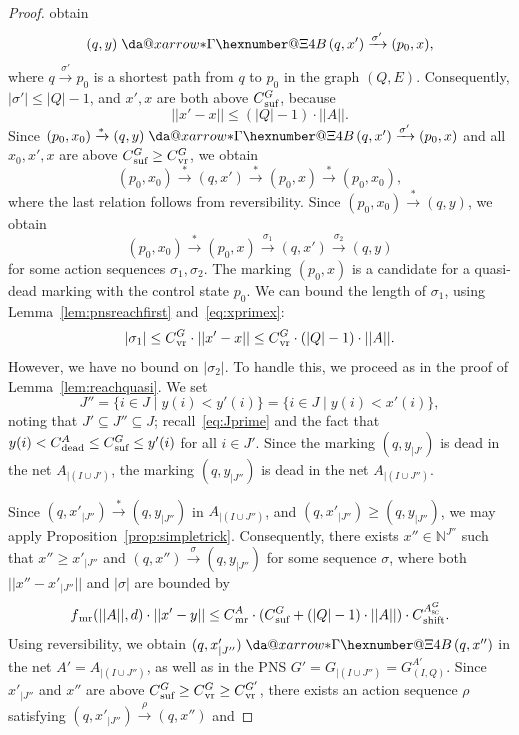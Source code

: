 \documentclass[11pt,a4paper]{amsart}
\makeatletter
\newcommand{\step}[1]{\mathrel{\xrightarrow{#1}}}
\newcommand{\reach}{\step{*}}
\newcommand{\virtual}[1]{\mathrel{\xdashrightarrow{#1}}\hspace{-0.3em}}
\newcommand{\vreach}{\virtual{*}}
\newcommand{\nnorm}[1]{||#1||}
\newcommand{\vr}{{}_\textnormal{vr}}
\newcommand{\mr}{{}_\textnormal{mr}}
\newcommand{\dead}{{}_\textnormal{dead}}
\newcommand{\suf}{{}_\textnormal{suf}}
\newcommand{\shift}{{}_\textnormal{shift}}
\newcommand{\ASC}{A_{\textsc{sc}}}
\newcommand{\Nat}{\mathbb{N}}
\newcommand{\restr}[1]{_{|{#1}}}
\newcommand{\setN}{\Nat}
\newcommand*{\da@rightarrow}{\mathchar"0\hexnumber@\symAMSa 4B }
\newcommand*{\xdashrightarrow}[2][]{%
  \mathrel{%
    \mathpalette{\da@xarrow{#1}{#2}{}\da@rightarrow{\,}{}}{}%
  }%
}
\newcommand*{\da@xarrow}[7]{%
  \sbox0{$\ifx#7\scriptstyle\scriptscriptstyle\else\scriptstyle\fi#5#1#6\m@th$}%
  \sbox2{$\ifx#7\scriptstyle\scriptscriptstyle\else\scriptstyle\fi#5#2#6\m@th$}%
  \sbox4{$#7\dabar@\m@th$}%
  \dimen@=\wd0 %
  \ifdim\wd2 >\dimen@
    \dimen@=\wd2 %
  \fi
  \count@=2 %
  \def\da@bars{\dabar@\dabar@}%
  \@whiledim\count@\wd4<\dimen@\do{%
    \advance\count@\@ne
    \expandafter\def\expandafter\da@bars\expandafter{%
      \da@bars
      \dabar@ 
    }%
  }%
  \mathrel{#3}%
  \mathrel{%
    \mathop{\da@bars}\limits
    \ifx\\#1\\%
    \else
      _{\copy0}%
    \fi
    \ifx\\#2\\%
    \else
      ^{\copy2}%
    \fi
  }%
  \mathrel{#4}%
}
\let\origtextsc\textsc
\renewcommand{\textsc}[1]{\textnormal{\origtextsc{#1}}}
\theoremstyle{plain}
\theoremstyle{definition}
\theoremstyle{defC}
\theoremstyle{thmC}
\makeatother
\begin{document}
\begin{proof}
	obtain
 \[(q,y)\vreach (q,x')\step{\sigma'}(p_0,x),\]
where
$q\step{\sigma'}p_0$ is a shortest path from $q$ to $p_0$ in the graph
$(Q,E)$. Consequently, $|\sigma'|\leq |Q|-1$, and $x',x$ are both above
$C\suf^G$, because
\begin{equation}\label{eq:xprimex}
	\nnorm{x'-x}\leq (|Q|-1)\cdot\nnorm{A}.
\end{equation}
Since $(p_0,x_0)\reach(q,y)\vreach(q,x')\step{\sigma'}(p_0,x)$
and all $x_0,x',x$ are above $C\suf^G\geq C\vr^G$,
 we obtain
\begin{equation*}
(p_0,x_0)\reach(q,x')\reach(p_0,x)\reach(p_0,x_0),
\end{equation*}
where the last relation follows from reversibility.
Since $(p_0,x_0)\reach(q,y)$, we obtain
\[(p_0,x_0)\reach(p_0,x)\step{\sigma_1}(q,x')\step{\sigma_2}(q,y)\]
for some action sequences
$\sigma_1,\sigma_2$.
The marking $(p_0,x)$ is a candidate for a quasi-dead marking with
the control state $p_0$.
We can bound the length of $\sigma_1$, using
Lemma~\ref{lem:pnsreachfirst} and~\eqref{eq:xprimex}: 
\begin{equation}\label{eq:sigmaone}
	|\sigma_1|\leq C\vr^G\cdot \nnorm{x'-x}\leq
C\vr^G\cdot(|Q|-1)\cdot\nnorm{A}.
\end{equation}
However, we have no bound on $|\sigma_2|$. To handle this, we proceed
as in the proof of Lemma~\ref{lem:reachquasi}.
We set 
\begin{equation}\label{eq:Jprimeprime}
	J''=\{i\in J\mid y(i)< y'(i)\}=\{i\in J\mid y(i)<x'(i)\},
\end{equation}
	noting that $J'\subseteq J''\subseteq J$; recall~\eqref{eq:Jprime} and
	the fact that 
		 $y(i)<C\dead^A\leq C\suf^G\leq y'(i)$ for
	all $i\in J'$.
Since the marking  $(q,y\restr{J'})$ is dead in the net  $A\restr{(I\cup
J')}$, the marking
$(q,y\restr{J''})$ is dead in the net $A\restr{(I\cup J'')}$.

Since $(q,x'\restr{J''})\reach(q,y\restr{J''})$ in  
 $A\restr{(I\cup J'')}$, and  $(q,x'\restr{J''})\geq
 (q,y\restr{J''})$,
 we may apply
 Proposition~\ref{prop:simpletrick}. Consequently, there exists 
 $x''\in \setN^{J''}$ such that
 $x''\geq x'\restr{J''}$ 
and $(q,x'')\step{\sigma}(q,y\restr{J''})$ for some sequence $\sigma$,
where both $\nnorm{x''-x'\restr{J''}}$ and $|\sigma|$ are bounded by
\begin{equation}\label{eq:boundfmr} 
f\mr(\nnorm{A},d)\cdot \nnorm{x'-y}\leq C\mr^A\cdot
	(C\suf^G+(|Q|-1)\cdot\nnorm{A})\cdot C\shift^{\ASC^G}.
\end{equation}
Using reversibility, we obtain $(q,x'\restr{J''})\vreach (q,x'')$
in the net $A'=A\restr{(I\cup J'')}$, as well as in the PNS
$G'=G\restr{(I\cup J'')}=G^{A'}_{(I,Q)}$. Since $x'\restr{J''}$ and
$x''$ are above $C\suf^G\geq C\vr^G\geq C\vr^{G'}$, there exists an
action sequence $\rho$ satisfying
$(q,x'\restr{J''})\step{\rho}(q,x'')$ and 


\end{proof}
\end{document}
